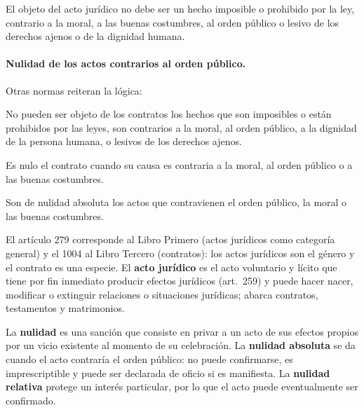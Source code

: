 \documentclass[12pt,oneside]{book}
\begin{document}
\begin{regla}
El objeto del acto jurídico no debe ser un hecho imposible o prohibido por la ley, contrario a la moral, a las buenas costumbres, al orden público o lesivo de los derechos ajenos o de la dignidad humana.
\end{regla}

\paragraph{Nulidad de los actos contrarios al orden público.} Otras normas reiteran la lógica:

\begin{regla}
No pueden ser objeto de los contratos los hechos que son imposibles o están prohibidos por las leyes, son contrarios a la moral, al orden público, a la dignidad de la persona humana, o lesivos de los derechos ajenos.
\end{regla}

\begin{regla}
Es nulo el contrato cuando su causa es contraria a la moral, al orden público o a las buenas costumbres.
\end{regla}

\begin{regla}
Son de nulidad absoluta los actos que contravienen el orden público, la moral o las buenas costumbres.
\end{regla}

El artículo 279 corresponde al Libro Primero (actos jurídicos como categoría general) y el 1004 al Libro Tercero (contratos): los actos jurídicos son el género y el contrato es una especie. El \textbf{acto jurídico} es el acto voluntario y lícito que tiene por fin inmediato producir efectos jurídicos (art.~259) y puede hacer nacer, modificar o extinguir relaciones o situaciones jurídicas; abarca contratos, testamentos y matrimonios.

\begin{definicion}
La \textbf{nulidad} es una sanción que consiste en privar a un acto de sus efectos propios por un vicio existente al momento de su celebración. La \textbf{nulidad absoluta} se da cuando el acto contraría el orden público: no puede confirmarse, es imprescriptible y puede ser declarada de oficio si es manifiesta. La \textbf{nulidad relativa} protege un interés particular, por lo que el acto puede eventualmente ser confirmado.
\end{definicion}
\end{document}
